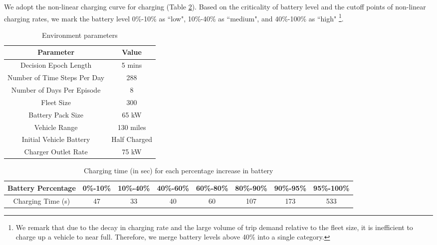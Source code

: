 We adopt the non-linear charging curve for charging (Table \ref{tab:nonlinear-charging-curve}). Based on the criticality of battery level and the cutoff points of non-linear charging rates, we mark the battery level 0\%-10\% as ``low", 10\%-40\% as ``medium", and 40\%-100\% as ``high"  \footnote{We remark that due to the decay in charging rate and the large volume of trip demand relative to the fleet size, it is inefficient to charge up a vehicle to near full. Therefore, we merge battery levels above 40\% into a single category.}.

\begin{table}[htb]
    \centering
    \begin{tabular}{|c|c|}
        \hline
        Parameter & Value \\
        \hline
        Decision Epoch Length & 5 mins\\
        Number of Time Steps Per Day & 288\\
        Number of Days Per Episode & 8\\
        Fleet Size & 300\\
        Battery Pack Size & 65 kW\\
        Vehicle Range & 130 miles\\
        Initial Vehicle Battery & Half Charged\\
        Charger Outlet Rate & 75 kW\\
        \hline
    \end{tabular}
    \caption{Environment parameters}
    \label{tab:env-params}
\end{table}

\begin{table}[htb]
    \centering
    \begin{tabular}{|c|c|c|c|c|c|c|c|}
        \hline
        Battery Percentage & 0\%-10\% & 10\%-40\% & 40\%-60\% & 60\%-80\% & 80\%-90\% & 90\%-95\% & 95\%-100\%\\
        \hline
        Charging Time (s) & 47 & 33 & 40 & 60 & 107 & 173 & 533 \\
         \hline
    \end{tabular}
    \caption{Charging time (in sec) for each percentage increase in battery}
    \label{tab:nonlinear-charging-curve}
\end{table}


